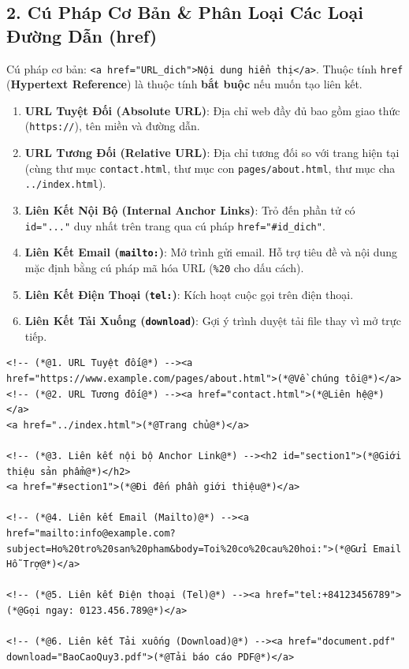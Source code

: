 \documentclass[11pt,oneside]{book}
\newcommand{\codeinline}[1]{\textcolor{accentOrange}{\texttt{#1}}}
\newcommand{\term}[1]{\textbf{\textcolor{primaryBlue}{#1}}}
\begin{document}
\subsection{2. Cú Pháp Cơ Bản \& Phân Loại Các Loại Đường Dẫn (href)}
Cú pháp cơ bản: \codeinline{<a href="URL\_dich">Nội dung hiển thị</a>}. Thuộc tính \codeinline{href} (\term{Hypertext Reference}) là thuộc tính \textbf{bắt buộc} nếu muốn tạo liên kết.

\begin{enumerate}
    \item \textbf{URL Tuyệt Đối (\term{Absolute URL})}: Địa chỉ web đầy đủ bao gồm giao thức (\codeinline{https://}), tên miền và đường dẫn.
    \item \textbf{URL Tương Đối (\term{Relative URL})}: Địa chỉ tương đối so với trang hiện tại (cùng thư mục \codeinline{contact.html}, thư mục con \codeinline{pages/about.html}, thư mục cha \codeinline{../index.html}).
    \item \textbf{Liên Kết Nội Bộ (\term{Internal Anchor Links})}: Trỏ đến phần tử có \codeinline{id="..."} duy nhất trên trang qua cú pháp \codeinline{href="\#id\_dich"}.
    \item \textbf{Liên Kết Email (\codeinline{mailto:})}: Mở trình gửi email. Hỗ trợ tiêu đề và nội dung mặc định bằng cú pháp mã hóa URL (\codeinline{\%20} cho dấu cách).
    \item \textbf{Liên Kết Điện Thoại (\codeinline{tel:})}: Kích hoạt cuộc gọi trên điện thoại.
    \item \textbf{Liên Kết Tải Xuống (\codeinline{download})}: Gợi ý trình duyệt tải file thay vì mở trực tiếp.
\end{enumerate}

\begin{codeWindow}
\begin{lstlisting}[language=HTML5]
<!-- (*@1. URL Tuyệt đối@*) --><a href="https://www.example.com/pages/about.html">(*@Về chúng tôi@*)</a>
<!-- (*@2. URL Tương đối@*) --><a href="contact.html">(*@Liên hệ@*)</a>
<a href="../index.html">(*@Trang chủ@*)</a>

<!-- (*@3. Liên kết nội bộ Anchor Link@*) --><h2 id="section1">(*@Giới thiệu sản phẩm@*)</h2>
<a href="#section1">(*@Đi đến phần giới thiệu@*)</a>

<!-- (*@4. Liên kết Email (Mailto)@*) --><a href="mailto:info@example.com?subject=Ho%20tro%20san%20pham&body=Toi%20co%20cau%20hoi:">(*@Gửi Email Hỗ Trợ@*)</a>

<!-- (*@5. Liên kết Điện thoại (Tel)@*) --><a href="tel:+84123456789">(*@Gọi ngay: 0123.456.789@*)</a>

<!-- (*@6. Liên kết Tải xuống (Download)@*) --><a href="document.pdf" download="BaoCaoQuy3.pdf">(*@Tải báo cáo PDF@*)</a>
\end{lstlisting}
\end{codeWindow}
\end{document}
